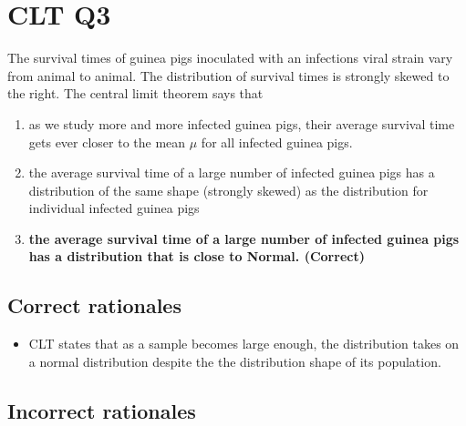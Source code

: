 \documentclass[letterpaper,12pt,twoside,printwatermark=false]{pinp}
\providecommand{\tightlist}{%
  \setlength{\itemsep}{0pt}\setlength{\parskip}{0pt}}
\begin{document}
\hypertarget{clt-q3}{%
\section{CLT Q3}\label{clt-q3}}

The survival times of guinea pigs inoculated with an infections viral
strain vary from animal to animal. The distribution of survival times is
strongly skewed to the right. The central limit theorem says that

\begin{enumerate}
\def\labelenumi{\alph{enumi})}
\tightlist
\item
  as we study more and more infected guinea pigs, their average survival
  time gets ever closer to the mean \(\mu\) for all infected guinea
  pigs.
\item
  the average survival time of a large number of infected guinea pigs
  has a distribution of the same shape (strongly skewed) as the
  distribution for individual infected guinea pigs
\item
  \textbf{the average survival time of a large number of infected guinea
  pigs has a distribution that is close to Normal. (Correct)}
\end{enumerate}

\hypertarget{correct-rationales-4}{%
\subsection{Correct rationales}\label{correct-rationales-4}}

\begin{itemize}
\tightlist
\item
  CLT states that as a sample becomes large enough, the distribution
  takes on a normal distribution despite the the distribution shape of
  its population.
\end{itemize}

\hypertarget{incorrect-rationales-4}{%
\subsection{Incorrect rationales}\label{incorrect-rationales-4}}





\end{document}
